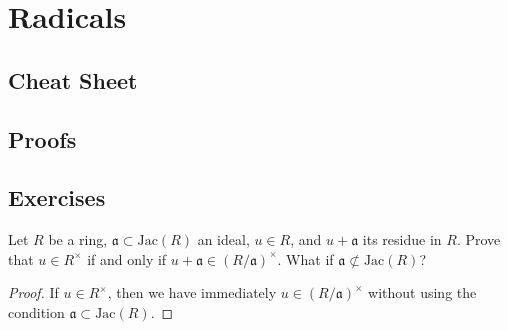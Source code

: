 \chapter{Radicals}

\section{Cheat Sheet}

\section{Proofs}

\section{Exercises}

\begin{exr}
    Let \(R\) be a ring, \(\mathfrak{a} \subset \mathrm{Jac}(R)\) an ideal, \(u \in R\), and \(u + \mathfrak{a}\) its residue in \(R\). Prove that \(u \in R^\times\) if and only if \(u + \mathfrak{a} \in (R / \mathfrak{a})^\times\). What if \(\mathfrak{a} \not\subset \mathrm{Jac}(R)\)?
\end{exr}
\begin{proof}
    If \(u \in R^\times\), then we have immediately \(u \in (R/\mathfrak{a})^\times\) without using the condition \(\mathfrak{a} \subset \mathrm{Jac}(R)\).
\end{proof}